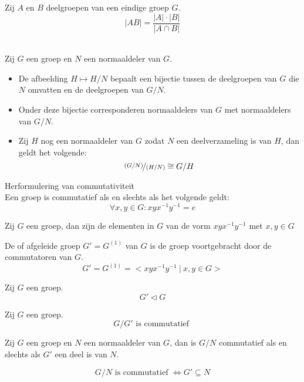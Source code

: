 \documentclass[main.tex]{subfiles}
\begin{document}
\begin{st}
Zij $A$ en $B$ deelgroepen van een eindige groep $G$.
\[ |AB| = \frac{|A|\cdot|B|}{|A\cap B|} \]
\end{st}

\begin{st}
\\
Zij $G$ een groep en $N$ een normaaldeler van $G$.
\begin{itemize}
\item De afbeelding $H \mapsto H/N$ bepaalt een bijectie tussen de deelgroepen van $G$ die $N$ omvatten en de deelgroepen van $G/N$.
\item Onder deze bijectie corresponderen normaaldelers van $G$ met normaaldelers van $G/N$.
\item Zij $H$ nog een normaaldeler van $G$ zodat $N$ een deelverzameling is van $H$, dan geldt het volgende:
\[ \nicefrac{(G/N)}{(H/N)} \cong G/H\]
\end{itemize}
\end{st}

\begin{st}
Herformulering van commutativiteit\\
Een groep is commutatief als en slechts als het volgende geldt:
\[ \forall x,y \in G: xyx^{-1}y^{-1} = e \]
\end{st}

\begin{de}
Zij $G$ een groep, dan zijn de elementen in $G$ van de vorm $xyx^{-1}y^{-1}$ met $x,y\in G$ 
\end{de}

\begin{de}
De  of afgeleide groep $G' = G^{(1)}$ van $G$ is de groep voortgebracht door de commutatoren van $G$.
\[ G' = G^{(1)} = < xyx^{-1}y^{-1} \ |\ x,y\in G > \]
\end{de}

\begin{st}
Zij $G$ een groep.
\[ G' \triangleleft G \]
\end{st}

\begin{st}
Zij $G$ een groep.
\[ G/G' \text{ is commutatief } \]
\end{st}

\begin{st}
Zij $G$ een groep en $N$ een normaaldeler van $G$, dan is $G/N$ commutatief als en slechts als $G'$ een deel is van $N$.

\[ G/N \text{ is commutatief } \Leftrightarrow G' \subseteq N \]
\end{st}
\end{document}
